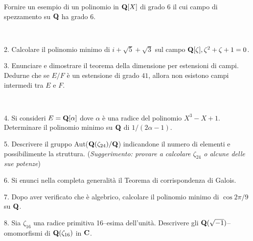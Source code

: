  Fornire un esempio di un polinomio in ${\bf Q}[X]$ di grado 6 il cui campo di spezzamento su ${\bf Q}$ ha grado 6.\medskip\bigskip\bigskip

\ \dotfill\ \bigskip\bigskip\bigskip


\vfil\eject


\item{2.} Calcolare il polinomio minimo di $i+\sqrt5+\sqrt{3}$ sul campo
${\bf Q}[\zeta],\zeta^2+\zeta+1=0$.\vv


\item{3.} Enunciare e dimostrare il teorema della dimensione per estensioni di campi. Dedurne che se $E/F$
\`e un estensione di grado $41$, allora non esistono campi intermedi tra $E$ e $F$. 

\ve\ \vs


\item{4.} Si consideri $E={\bf Q}[\alpha]$ dove $\alpha$ \`{e}
una radice del polinomio $X^3-X+1$. Determinare il polinomio minimo
su ${\bf Q}$ di $1/(2\alpha-1)$. \vv

\item{5.} Descrivere il gruppo Aut(${\bf Q}(\zeta_{24})/{\bf Q}$) indicandone
il numero di elementi e possibilimente la struttura. \hfill\break ({\it Suggerimento: provare
a calcolare $\zeta_{24}$ o alcune delle sue potenze})
\ve\ \vs


\item{6.} Si enunci nella completa generalit\`a il Teorema di
corrispondenza di Galois.\vv\vv


\item{7.}   Dopo aver verificato che \`e algebrico, calcolare
il polinomio minimo di $\cos 2\pi/9$ su ${\bf Q}$.
\vv\vv

\item{8.} Sia $\zeta_{16}$ una radice primitiva 16--esima
dell'unit\`a. Descrivere gli ${\bf Q}(\sqrt{-1})$--omomorfismi di
${\bf Q}(\zeta_{16})$ in ${\bf C}$.

\vv



\ \vst
 \bye
